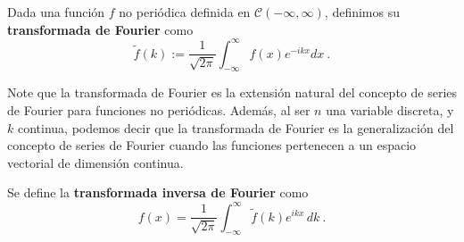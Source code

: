 \begin{defi} 
    Dada una función $f$ no periódica definida en $\mathscr{C}(-\infty, \infty)$, definimos su \textbf{transformada de Fourier} como 
    \begin{equation}\label{T.Fourier}
        \boxed{\tilde{f}(k) := \frac{1}{\sqrt{2\pi}} \int_{-\infty}^{\infty} f(x) e^{-ikx} dx \ .} 
    \end{equation}  
\end{defi}

Note que la transformada de Fourier es la extensión natural del concepto de series de Fourier para funciones no periódicas. Además, al ser $n$ una variable discreta, y $k$ continua, podemos decir que la transformada de Fourier es la generalización del concepto de series de Fourier cuando las funciones pertenecen a un espacio vectorial de dimensión continua.

\begin{defi}
    Se define la \textbf{transformada inversa de Fourier} como
      \begin{equation}\label{I.Fourier}
     \boxed{f(x) = \frac{1}{\sqrt{2\pi}} \int_{-\infty}^{\infty} \tilde{f}(k) e^{ikx} \,dk \ .} 
    \end{equation}  
\end{defi}

